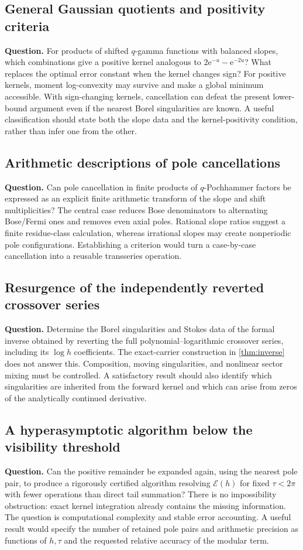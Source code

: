 \documentclass[11pt,a4paper]{article}
\theoremstyle{definition}
\theoremstyle{remark}
\newcommand{\e}{\mathrm e}
\newcommand{\Ecal}{\mathcal E}
\begin{document}
\subsection{General Gaussian quotients and positivity criteria}
\textbf{Question.} For products of shifted $q$-gamma functions with balanced
slopes, which combinations give a positive kernel analogous to
$2\e^{-u}-\e^{-2u}$? What replaces the optimal error constant when the
kernel changes sign?
For positive kernels, moment log-convexity may survive and make a global
minimum accessible. With sign-changing kernels, cancellation can defeat
the present lower-bound argument even if the nearest Borel singularities
are known. A useful classification should state both the slope data and
the kernel-positivity condition, rather than infer one from the other.

\subsection{Arithmetic descriptions of pole cancellations}
\textbf{Question.} Can pole cancellation in finite products of
$q$-Pochhammer factors be expressed as an explicit finite arithmetic
transform of the slope and shift multiplicities?
The central case reduces Bose denominators to alternating Bose/Fermi
ones and removes even axial poles. Rational slope ratios suggest a finite
residue-class calculation, whereas irrational slopes may create
nonperiodic pole configurations. Establishing a criterion would turn a
case-by-case cancellation into a reusable transseries operation.

\subsection{Resurgence of the independently reverted crossover series}
\textbf{Question.} Determine the Borel singularities and Stokes data of the
formal inverse obtained by reverting the full polynomial--logarithmic
crossover series, including its $\log h$ coefficients.
The exact-carrier construction in \cref{thm:inverse} does not answer this.
Composition, moving singularities, and nonlinear sector mixing must be
controlled. A satisfactory result should also identify which singularities
are inherited from the forward kernel and which can arise from zeros of
the analytically continued derivative.

\subsection{A hyperasymptotic algorithm below the visibility threshold}
\textbf{Question.} Can the positive remainder be expanded again, using the
nearest pole pair, to produce a rigorously certified algorithm resolving
$\Ecal(h)$ for fixed $\tau<2\pi$ with fewer operations than direct tail
summation?
There is no impossibility obstruction: exact kernel integration already
contains the missing information. The question is computational complexity
and stable error accounting. A useful result would specify the number of
retained pole pairs and arithmetic precision as functions of $h,\tau$ and
the requested relative accuracy of the modular term.
\end{document}
